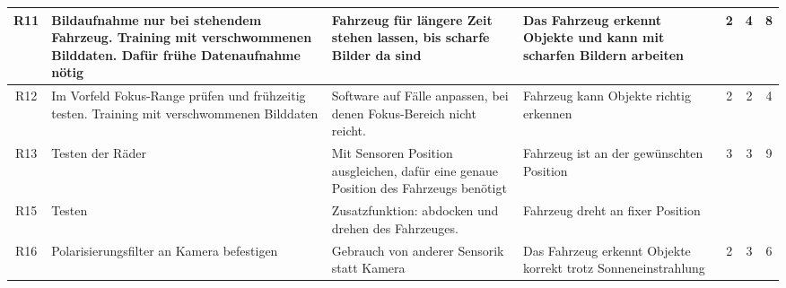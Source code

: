 \documentclass[../main.tex]{subfiles}
\begin{document}
\begin{landscape}
\begin{longtable}{|c|p{7cm}|p{5cm}|p{5cm}|c|c|c|}
R11 & Bildaufnahme nur bei stehendem Fahrzeug. Training mit verschwommenen Bilddaten. Dafür frühe Datenaufnahme nötig & Fahrzeug für längere Zeit stehen lassen, bis scharfe Bilder da sind & Das Fahrzeug erkennt Objekte und kann mit scharfen Bildern arbeiten & 2 & 4 & 8 \\ \hline
R12 & Im Vorfeld Fokus-Range prüfen und frühzeitig testen. Training mit verschwommenen Bilddaten & Software auf Fälle anpassen, bei denen Fokus-Bereich nicht reicht. & Fahrzeug kann Objekte richtig erkennen & 2 & 2 & 4 \\ \hline
R13 & Testen der Räder & Mit Sensoren Position ausgleichen, dafür eine genaue Position des Fahrzeugs benötigt & Fahrzeug ist an der gewünschten Position & 3 & 3 & 9 \\ \hline
R15 & Testen & Zusatzfunktion: abdocken und drehen des Fahrzeuges. & Fahrzeug dreht an fixer Position & & & \\ \hline
R16 & Polarisierungsfilter an Kamera befestigen & Gebrauch von anderer Sensorik statt Kamera & Das Fahrzeug erkennt Objekte korrekt trotz Sonneneinstrahlung & 2 & 3 & 6 \\ \hline
\end{longtable}

\normalsize
\end{landscape}
\newpage
\end{document}
